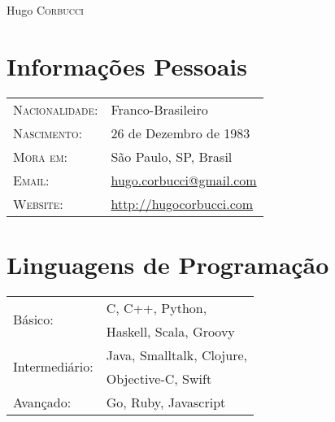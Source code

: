 \documentclass[letter,10pt]{article}
\begin{document}
\par{\centering
		{\Huge Hugo \textsc{Corbucci}
	}\bigskip\par}

\begin{multicols}{2}
\section{Informações Pessoais}
\begin{tabular}{p{2.5cm}l}
  \textsc{Nacionalidade:} & Franco-Brasileiro\\
  \textsc{Nascimento:} & 26 de Dezembro de 1983\\
  \textsc{Mora em:}   & São Paulo, SP, Brasil \\
  \textsc{Email:}     &
  \href{mailto:hugo.corbucci@gmail.com}{hugo.corbucci@gmail.com}\\
  \textsc{Website:} & \href{http://hugocorbucci.com}{http://hugocorbucci.com}
\end{tabular}

\section{Linguagens de Programação}
\begin{tabular}[t]{p{2.5cm}l}
  \multirow[t]{2}{*}{Básico:} & C, C++, Python,\\
 & Haskell, Scala, Groovy\\
  \multirow[t]{2}{*}{Intermediário:} & Java, Smalltalk, Clojure,\\
 & Objective-C, Swift\\
 Avançado:& Go, Ruby, Javascript\\
\end{tabular}
\end{multicols}
\end{document}
